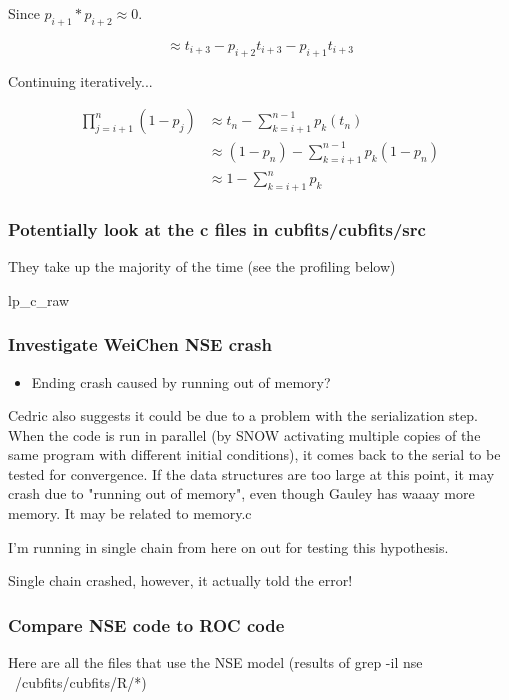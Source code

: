 \documentclass[11pt]{article} %
\begin{document}
Since $p_{i+1} * p_{i+2} \approx 0$.

$$\approx t_{i+3} - p_{i+2}t_{i+3} - p_{i+1}t_{i+3}$$

Continuing iteratively...

\begin{align*}
	\prod_{j=i+1}^{n} (1-p_j) &\approx
	t_n - \sum_{k=i+1}^{n-1}p_k(t_n) \\
	&\approx (1-p_n) - \sum_{k=i+1}^{n-1}p_k(1 - p_n)\\
 	&\approx 1 -  \sum_{k=i+1}^{n}p_k
\end{align*}

\subsubsection{Potentially look at the c files in cubfits/cubfits/src}
They take up the majority of the time (see the profiling below)

lp\_c\_raw


\subsubsection{Investigate WeiChen NSE crash}
\begin{itemize}
\item Ending crash caused by running out of memory?
\end{itemize}

Cedric also suggests it could be due to a problem with the serialization step. When the code is run in parallel (by SNOW activating multiple copies of the same program with different initial conditions), it comes back to the serial to be tested for convergence. If the data structures are too large at this point, it may crash due to "running out of memory", even though Gauley has waaay more memory. It may be related to memory.c

I'm running in single chain from here on out for testing this hypothesis.

Single chain crashed, however, it actually told the error!



\subsubsection{Compare NSE code to ROC code}

Here are all the files that use the NSE model (results of grep -il nse ~/cubfits/cubfits/R/*)
\end{document}
